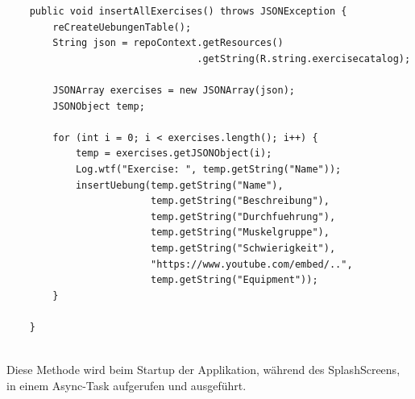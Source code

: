 \documentclass[FIPLY_base.tex]{subfiles}
\begin{document}
\begin{lstlisting}
    public void insertAllExercises() throws JSONException {
        reCreateUebungenTable();
        String json = repoContext.getResources()
                                 .getString(R.string.exercisecatalog);

        JSONArray exercises = new JSONArray(json);
        JSONObject temp;

        for (int i = 0; i < exercises.length(); i++) {
            temp = exercises.getJSONObject(i);
            Log.wtf("Exercise: ", temp.getString("Name"));
            insertUebung(temp.getString("Name"), 
                         temp.getString("Beschreibung"),
                         temp.getString("Durchfuehrung"), 
                         temp.getString("Muskelgruppe"), 
                         temp.getString("Schwierigkeit"), 
                         "https://www.youtube.com/embed/..", 
                         temp.getString("Equipment"));
        }

    }
\end{lstlisting}

\ \\
Diese Methode wird beim Startup der Applikation, während des SplashScreens, in einem Async-Task aufgerufen und ausgeführt.



\newpage
\end{document}
